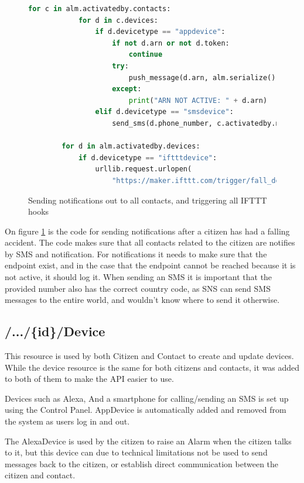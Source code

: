 \begin{figure}[H]
    \centering
    \begin{lstlisting}[language=Python]
        for c in alm.activatedby.contacts:
            for d in c.devices:
                if d.devicetype == "appdevice":
                    if not d.arn or not d.token:
                        continue
                    try:
                        push_message(d.arn, alm.serialize())
                    except:
                        print("ARN NOT ACTIVE: " + d.arn)
                elif d.devicetype == "smsdevice":
                    send_sms(d.phone_number, c.activatedby.name + " has had an falling accident, and requests help.")

        for d in alm.activatedby.devices:
            if d.devicetype == "iftttdevice":
                urllib.request.urlopen(
                    "https://maker.ifttt.com/trigger/fall_detected/with/key/" + d.token).read()
    \end{lstlisting}
    \caption{Sending notifications out to all contacts, and triggering all IFTTT hooks}
    \label{fig:notify_contacts}
\end{figure}

On figure \ref{fig:notify_contacts} is the code for sending notifications after a citizen has had a falling accident. The code makes sure that all contacts related to the citizen are notifies by SMS and notification. For notifications it needs to make sure that the endpoint exist, and in the case that the endpoint cannot be reached because it is not active, it should log it. When sending an SMS it is important that the provided number also has the correct country code, as SNS can send SMS messages to the entire world, and wouldn't know where to send it otherwise.



\subsection*{/.../\{id\}/Device}
This resource is used by both Citizen and Contact to create and update devices. While the device resource is the same for both citizens and contacts, it was added to both of them to make the API easier to use.

Devices such as Alexa, And a smartphone for calling/sending an SMS is set up using the Control Panel. AppDevice is automatically added and removed from the system as users log in and out. 

The AlexaDevice is used by the citizen to raise an Alarm when the citizen talks to it, but this device can due to technical limitations not be used to send messages back to the citizen, or establish direct communication between the citizen and contact.

